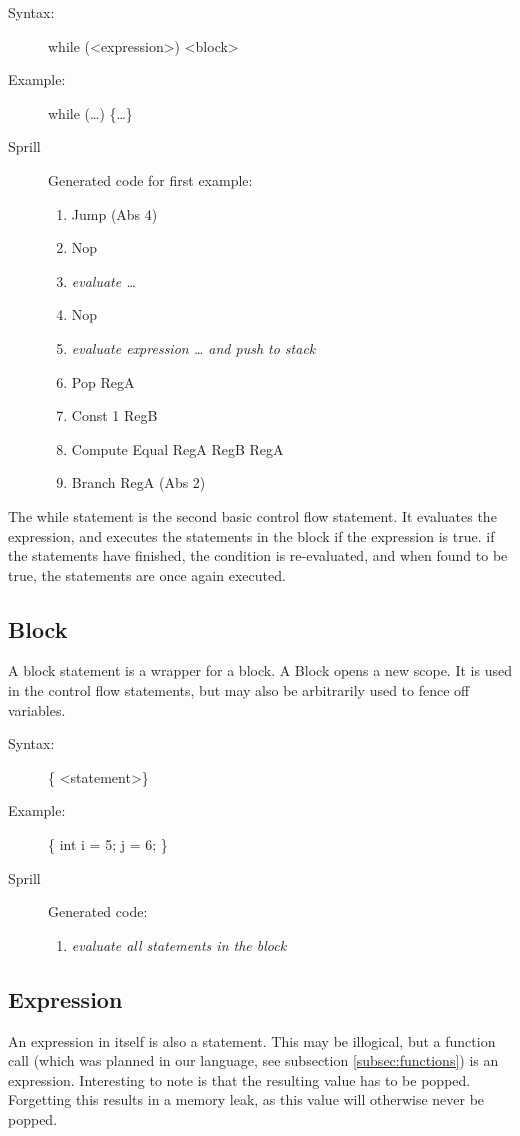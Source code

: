 \documentclass[10pt,a4paper]{report}
\begin{document}
\begin{description}
	\item[Syntax:] 
		while (\textless expression\textgreater ) \textless block\textgreater
	\item[Example:] 
		while (\ldots) \{\ldots\}
	\item[Sprill] Generated code for first example:
		\begin{enumerate}
			\item Jump (Abs 4)
			\item Nop
			\item \emph{evaluate \emph{\ldots}}
			\item Nop
			\item \emph{evaluate expression \emph{\ldots} and push to stack}
			\item Pop RegA
			\item Const 1 RegB
			\item Compute Equal RegA RegB RegA
			\item Branch RegA (Abs 2)
		\end{enumerate}
\end{description} 
The while statement is the second basic control flow statement. It evaluates the expression, and executes the statements in the block if the expression is true. if the statements have finished, the condition is re-evaluated, and when found to be true, the statements are once again executed.


\subsection{Block}
A block statement is a wrapper for a block. A Block opens a new scope. It is used in the control flow statements, but may also be arbitrarily used to fence off variables.

\begin{description}
	\item[Syntax:] 
		\{ \textless statement\textgreater * \}
	\item[Example:] 
		\{ int i = 5; j = 6; \}
	\item[Sprill] Generated code:
		\begin{enumerate}
			\item \emph{evaluate all statements in the block}
		\end{enumerate}
\end{description} 

\subsection{Expression}
An expression in itself is also a statement. This may be illogical, but a function call (which was planned in our language, see subsection \ref{subsec:functions}) is an expression. Interesting to note is that the resulting value has to be popped. Forgetting this results in a memory leak, as this value will otherwise never be popped.
\end{document}
